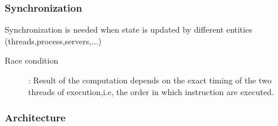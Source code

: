 \subsubsection{Synchronization}
Synchronization is needed when state is updated by different entities
(threads,process,servers,...)
\begin{description}
    \item[Race condition]: Result of the computation depends on the exact
        timing of the two threads of execution,i.e, the order in which instruction 
        are executed.

\end{description}

\subsubsection{Architecture}
